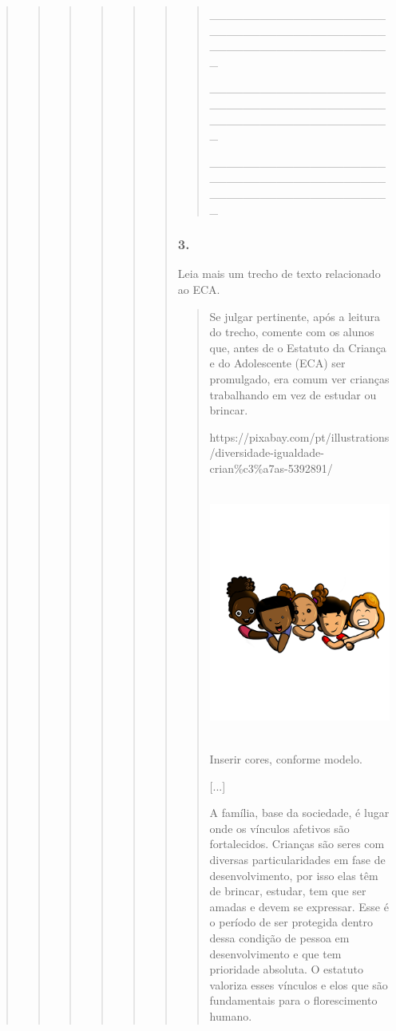 \begin{quote}
\begin{quote}
\begin{quote}
\begin{quote}
\begin{quote}
\begin{quote}
\begin{quote}
\_\_\_\_\_\_\_\_\_\_\_\_\_\_\_\_\_\_\_\_\_\_\_\_\_\_\_\_\_\_\_\_\_\_\_\_\_\_\_\_\_\_\_\_\_\_\_\_\_\_\_\_\_\_\_\_\_\_\_\_\_\_\_\_

\_\_\_\_\_\_\_\_\_\_\_\_\_\_\_\_\_\_\_\_\_\_\_\_\_\_\_\_\_\_\_\_\_\_\_\_\_\_\_\_\_\_\_\_\_\_\_\_\_\_\_\_\_\_\_\_\_\_\_\_\_\_\_\_

\_\_\_\_\_\_\_\_\_\_\_\_\_\_\_\_\_\_\_\_\_\_\_\_\_\_\_\_\_\_\_\_\_\_\_\_\_\_\_\_\_\_\_\_\_\_\_\_\_\_\_\_\_\_\_\_\_\_\_\_\_\_\_\_
\end{quote}

\subsubsection{3. }\label{section-62}

Leia mais um trecho de texto relacionado ao ECA.

\begin{quote}
Se julgar pertinente, após a leitura do trecho, comente com os alunos
que, antes de o Estatuto da Criança e do Adolescente (ECA) ser
promulgado, era comum ver crianças trabalhando em vez de estudar ou
brincar.

https://pixabay.com/pt/illustrations/diversidade-igualdade-crian\%c3\%a7as-5392891/

\includegraphics[width=2.70833in,height=3.25006in]{media/image27.png}

Inserir cores, conforme modelo.

{[}...{]}

A família, base da sociedade, é lugar onde os vínculos afetivos são
fortalecidos. Crianças são seres com diversas particularidades em fase
de desenvolvimento, por isso elas têm de brincar, estudar, tem que ser
amadas e devem se expressar. Esse é o período de ser protegida dentro
dessa condição de pessoa em desenvolvimento e que tem prioridade
absoluta. O estatuto valoriza esses vínculos e elos que são fundamentais
para o florescimento humano.


\end{quote}
\end{quote}
\end{quote}
\end{quote}
\end{quote}
\end{quote}
\end{quote}

